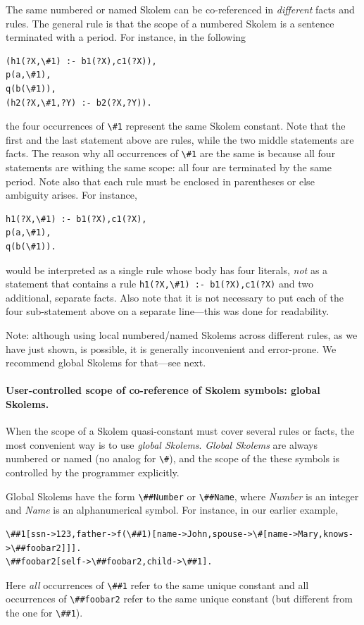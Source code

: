 \documentclass[11pt]{article}
\newcommand{\ERGO}{\mbox{\smaller{\ensuremath{\cal{E}}\smaller{{\sc{RGO}}}}}\xspace}
\newcommand{\FLSYSTEM}{\ERGO}
\newcommand{\bs}{\textbackslash}
\begin{document}
The same numbered or named
Skolem can be co-referenced in \emph{different} facts and
rules.  The general rule is that the scope of a numbered Skolem is a \FLSYSTEM
sentence terminated with a period. For instance, in the following
\begin{verbatim}
(h1(?X,\#1) :- b1(?X),c1(?X)),
p(a,\#1),
q(b(\#1)),
(h2(?X,\#1,?Y) :- b2(?X,?Y)).
\end{verbatim}
the four occurrences of \texttt{\bs{}\#1} represent the same Skolem constant.
Note that the first and the last statement above are rules, while the two
middle statements are facts. The reason why all occurrences of
\texttt{\bs{}\#1} are the same is because all
four statements are withing the same scope: all four are terminated by the
same period. Note also that each rule must be enclosed in parentheses or
else ambiguity arises. For instance,
\begin{verbatim}
h1(?X,\#1) :- b1(?X),c1(?X),
p(a,\#1),
q(b(\#1)).
\end{verbatim}
would be interpreted as a single rule whose body has four literals,
\emph{not} as a statement that contains a rule
\verb|h1(?X,\#1) :- b1(?X),c1(?X)|
and two additional, separate facts.
Also note that it is not necessary to put each of the four sub-statement above 
on a separate line---this was done for readability.

Note: although using local numbered/named Skolems across different rules,
as we have just shown, is possible, it is generally inconvenient and
error-prone. We recommend global Skolems for that---see next.

\paragraph{User-controlled scope of co-reference of Skolem symbols: global
  Skolems.}
When the scope of a Skolem quasi-constant must cover several rules or facts,
the most convenient way is to use \emph{global Skolems}.   
\emph{Global Skolems} are  always numbered or named (no analog for \verb|\#|),
and the scope of
the these symbols is controlled by the programmer explicitly.

\index{\bs{}\#\# - global Skolem}
Global Skolems have the form \texttt{\bs{}\#\#Number} or
\texttt{\bs{}\#\#Name}, where \emph{Number} is an integer and \emph{Name} is
an alphanumerical symbol.  
For instance, in our earlier example,
\begin{verbatim}
\##1[ssn->123,father->f(\##1)[name->John,spouse->\#[name->Mary,knows->\##foobar2]]].
\##foobar2[self->\##foobar2,child->\##1].
\end{verbatim}
Here
\emph{all} occurrences of \texttt{\bs{}\#\#1} refer to the same unique constant
and all occurrences of \texttt{\bs{}\#\#foobar2}
refer to the same unique constant (but different from the one for
\texttt{\bs{}\#\#1}).
\end{document}
